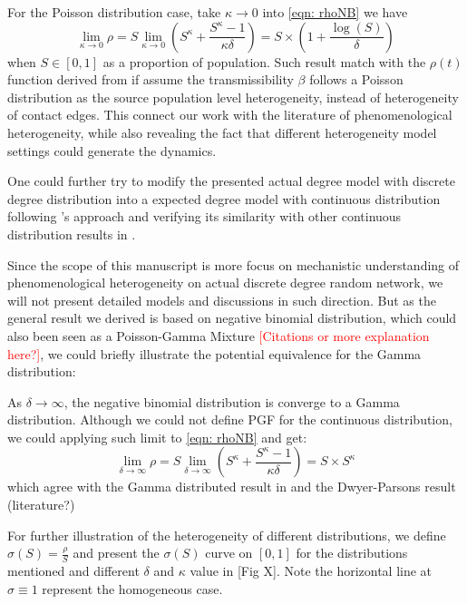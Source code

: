 \documentclass[12pt]{article}
\theoremstyle{plain}
\theoremstyle{definition}
\begin{document}
For the Poisson distribution case, take $\kappa\rightarrow 0$ into \eqref{eqn: rhoNB} we have
\begin{equation}
	\lim_{\kappa\rightarrow0}\rho=S\lim_{\kappa\rightarrow0}(S^{\kappa}+\frac{S^{\kappa}-1}{\kappa\delta})=S \times (1+\frac{\log(S)}{\delta})
\end{equation}
when $S \in [0,1]$ as a proportion of population.
Such result match with the $\rho(t)$ function derived from \cite{Novozhilov:2008} if assume the transmissibility $\beta$ follows a Poisson distribution as the source population level heterogeneity, instead of heterogeneity of contact edges.
This connect our work with the literature of phenomenological heterogeneity, while also revealing the fact that different heterogeneity model settings could generate the dynamics.

One could further try to modify the presented actual degree model with discrete degree distribution into a expected degree model with continuous distribution following \cite{MillerSlimVolz:2012}'s approach and verifying its similarity with other continuous distribution results in \cite{Novozhilov:2008}.

Since the scope of this manuscript is more focus on mechanistic understanding of phenomenological heterogeneity on actual discrete degree random network, we will not present detailed models and discussions in such direction.
But as the general result we derived is based on negative binomial distribution, which could also been seen as a Poisson-Gamma Mixture \textcolor{red}{[Citations or more explanation here?]}, we could briefly illustrate the potential equivalence for the Gamma distribution:

As $\delta \rightarrow \infty$, the negative binomial distribution is converge to a Gamma distribution. 
Although we could not define PGF for the continuous distribution, we could applying such limit to \eqref{eqn: rhoNB} and get:
\begin{equation}
	\lim_{\delta\rightarrow\infty}\rho=S\lim_{\delta\rightarrow\infty}(S^{\kappa}+\frac{S^{\kappa}-1}{\kappa\delta})=S \times S^{\kappa}
\end{equation}
which agree with the Gamma distributed result in \cite{Novozhilov:2008} and the Dwyer-Parsons result (literature?)

For further illustration of the heterogeneity of different distributions, we define $\sigma(S)=\frac{\rho}{S}$ and present the $\sigma(S)$ curve on $[0,1]$ for the distributions mentioned and different $\delta$ and $\kappa$ value in [Fig X]. 
Note the horizontal line at $\sigma\equiv1$ represent the homogeneous case.
\end{document}

